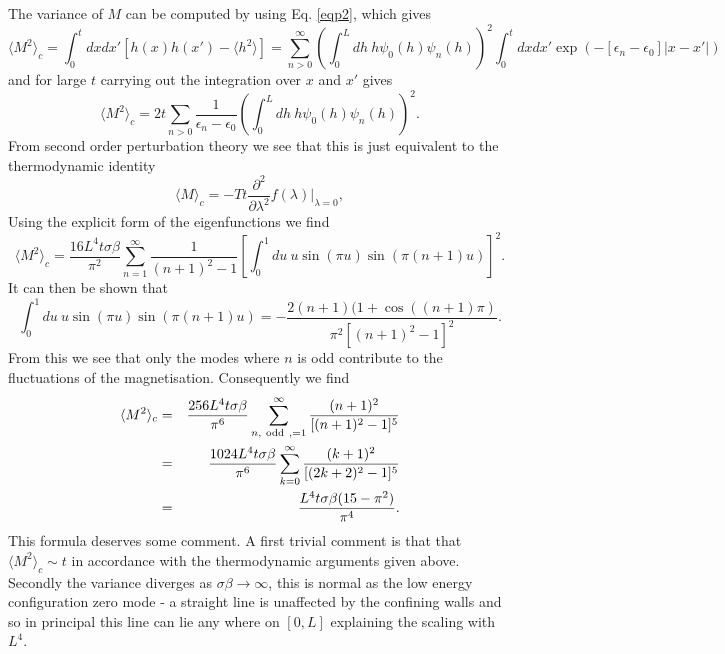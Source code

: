 The variance of $M$ can be computed by using Eq. \eqref{eqp2}, which gives
\begin{equation}
\langle M^2\rangle_c =\int_0^t dx dx'[ h(x)h(x')-\langle h^2\rangle] = \sum_{n>0}^\infty
\left(\int_0^L dh\ h \psi_0(h)\psi_n(h)\right)^2\int _0^t dxdx' \exp(-[\epsilon_n-\epsilon_0]|x-x'|)
\end{equation}
and for large $t$ carrying out the integration over $x$ and $x'$ gives
\begin{equation}
\langle M^2\rangle_c = 2t \sum_{n>0} \frac{1}{\epsilon_n-\epsilon_0}\left(\int_0^L dh\ h \psi_0(h)\psi_n(h)\right)^2.
\end{equation}
From second order perturbation theory we see that this is just equivalent to the thermodynamic
identity
\begin{equation}
\langle M\rangle_c = -Tt\frac{\partial^2}{\partial \lambda^2}f (\lambda)|_{\lambda=0},
\end{equation}
Using the explicit form of the eigenfunctions we find
\begin{equation}
\langle M^2\rangle_c=\frac{16L^4 t\sigma\beta }{\pi^2}\sum_{n=1}^\infty \frac{1}{(n+1)^2-1}\left[ \int_0^1 du \ u 
\sin(\pi u) \sin(\pi (n+1)u)\right]^2.
\end{equation}
It can then be shown that
\begin{equation}
\int_0^1 du \ u 
\sin(\pi u) \sin(\pi (n+1)u)= -\frac{2(n+1) (1+ \cos((n+1)\pi)}{\pi^2[(n+1)^2-1]^2}.
\end{equation}
From this we see that only the modes where $n$ is odd contribute to the fluctuations of the magnetisation. Consequently we find
\begin{eqnarray}
\langle M^2\rangle_c&=&\frac{256 L^4 t\sigma\beta }{\pi^6}\sum_{n,\ {\rm odd}\ ,=1}^\infty \frac{(n+1)^2}{[(n+1)^2-1]^5}\\
&=& \frac{1024L^4 t\sigma\beta }{\pi^6}\sum_{k=0}^\infty \frac{(k+1)^2}{[(2k+2)^2-1]^5}\\
&=& \frac{L^4 t\sigma\beta(15-\pi^2) }{\pi^4}.
\end{eqnarray}
This formula deserves some comment. A first trivial comment is that that $\langle M^2\rangle_c\sim t$ in accordance with the thermodynamic arguments given above. Secondly the variance diverges as $\sigma\beta\to\infty$, this is normal as the low energy configuration zero mode  - a straight line is unaffected by the confining walls and so in principal this line can lie any where on $[0,L ]$ explaining the scaling with $L^4$.


